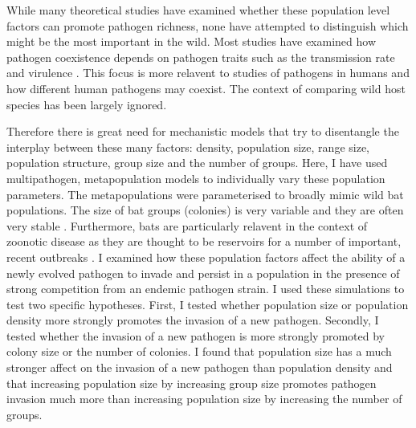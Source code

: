 While many theoretical studies have examined whether these population level factors can promote pathogen richness, none have attempted to distinguish which might be the most important in the wild.
Most studies have examined how pathogen coexistence depends on pathogen traits such as the transmission rate and virulence \cite{allen2004sis, may1994superinfection}.
This focus is more relavent to studies of pathogens in humans and how different human pathogens may coexist.
The context of comparing wild host species has been largely ignored.





Therefore there is great need for mechanistic models that try to disentangle the interplay between these many factors: density, population size, range size, population structure, group size and the number of groups.
Here, I have used multipathogen, metapopulation models to individually vary these population parameters.
The metapopulations were parameterised to broadly mimic wild bat populations.
The size of bat groups (colonies) is very variable and they are often very stable \cite{kerth2011bats, mccracken1981social}.
Furthermore, bats are particularly relavent in the context of zoonotic disease as they are thought to be reservoirs for a number of important, recent outbreaks \cite{calisher2006bats, li2005bats}.
I examined how these population factors affect the ability of a newly evolved pathogen to invade and persist in a population in the presence of strong competition from an endemic pathogen strain.
I used these simulations to test two specific hypotheses.
First, I tested whether population size or population density more strongly promotes the invasion of a new pathogen.
Secondly, I tested whether the invasion of a new pathogen is more strongly promoted by colony size or the number of colonies.
I found that population size has a much stronger affect on the invasion of a new pathogen than population density and that increasing population size by increasing group size promotes pathogen invasion much more than increasing population size by increasing the number of groups.















